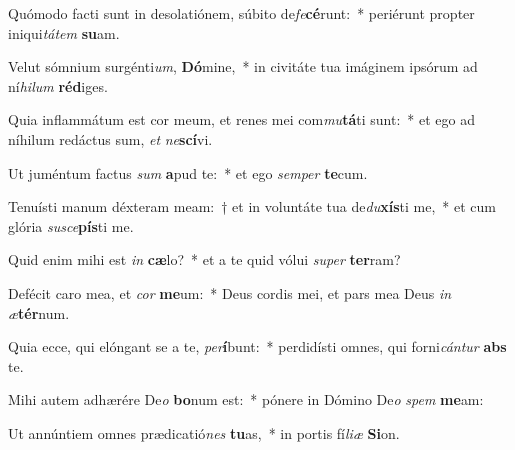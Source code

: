 \item Quómodo facti sunt in desolatiónem, súbito de\textit{fe}\textbf{cé}runt:~* periérunt propter iniqui\textit{tá}\textit{tem} \textbf{su}am.
\item Velut sómnium surgénti\textit{um}, \textbf{Dó}mine,~* in civitáte tua imáginem ipsórum ad ní\textit{hi}\textit{lum} \textbf{réd}iges.
\item Quia inflammátum est cor meum, et renes mei com\textit{mu}\textbf{tá}ti sunt:~* et ego ad níhilum redáctus sum, \textit{et} \textit{ne}\textbf{scí}vi.
\item Ut juméntum factus \textit{sum} \textbf{a}pud te:~* et ego \textit{sem}\textit{per} \textbf{te}cum.
\item Tenuísti manum déxteram meam:~† et in voluntáte tua de\textit{du}\textbf{xís}ti me,~* et cum glória \textit{su}\textit{sce}\textbf{pís}ti me.
\item Quid enim mihi est \textit{in} \textbf{cæ}lo?~* et a te quid vólui \textit{su}\textit{per} \textbf{ter}ram?
\item Defécit caro mea, et \textit{cor} \textbf{me}um:~* Deus cordis mei, et pars mea Deus \textit{in} \textit{æ}\textbf{tér}num.
\item Quia ecce, qui elóngant se a te, \textit{per}\textbf{í}bunt:~* perdidísti omnes, qui forni\textit{cán}\textit{tur} \textbf{abs} te.
\item Mihi autem adhærére De\textit{o} \textbf{bo}num est:~* pónere in Dómino De\textit{o} \textit{spem} \textbf{me}am:
\item Ut annúntiem omnes prædicatió\textit{nes} \textbf{tu}as,~* in portis fí\textit{li}\textit{æ} \textbf{Si}on.
